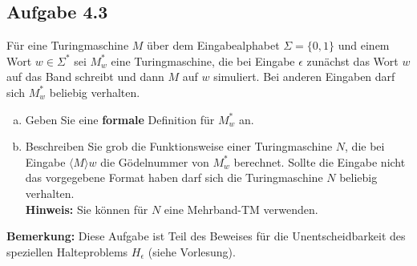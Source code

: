 \subsection*{Aufgabe 4.3}
Für eine Turingmaschine $M$ über dem Eingabealphabet $\Sigma = \{0,1\}$ und einem Wort $w \in \Sigma^*$ sei $M_w^*$ eine Turingmaschine, die bei Eingabe $\epsilon$ zunächst das Wort $w$ auf das Band schreibt und dann $M$ auf $w$ simuliert. Bei anderen Eingaben darf sich $M_w^*$ beliebig verhalten.
\begin{enumerate}[(a)]
	\item Geben Sie eine \textbf{formale} Definition für $M_w^*$ an.
	\item Beschreiben Sie grob die Funktionsweise einer Turingmaschine $N$, die bei Eingabe $\langle M \rangle w$ die Gödelnummer von $M_w^*$ berechnet. Sollte die Eingabe nicht das vorgegebene Format haben darf sich die Turingmaschine $N$ beliebig verhalten.\\
	\textbf{Hinweis:} Sie können für $N$  eine Mehrband-TM verwenden.
\end{enumerate}
\textbf{Bemerkung:} Diese Aufgabe ist Teil des Beweises für die Unentscheidbarkeit des speziellen Halteproblems $H_\epsilon$ (siehe Vorlesung).